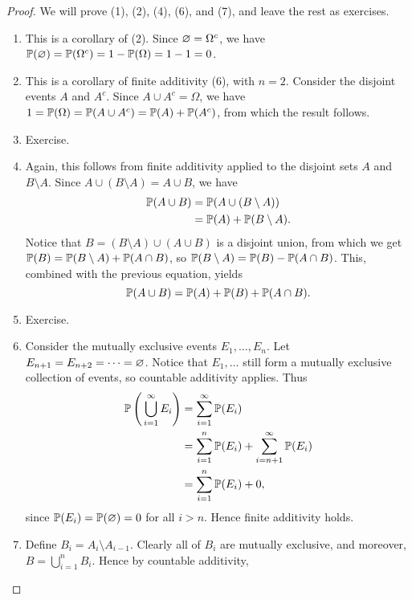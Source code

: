 \begin{proof}
  We will prove (1), (2), (4), (6), and (7), and leave the rest as exercises.
  \begin{enumerate}
    \item This is a corollary of (2). Since $\varnothing = \Omega^{c}$, we have $\operatorname{\mathbb{P}}(\varnothing) = \operatorname{\mathbb{P}}(\Omega^{c}) = 1 - \operatorname{\mathbb{P}}(\Omega) = 1 - 1 = 0$.
    \item This is a corollary of finite additivity (6), with $n = 2$. Consider the disjoint events $A$ and $A^{c}$. Since $A \cup A^{c} = \Omega$, we have $1 = \operatorname{\mathbb{P}}(\Omega) = \operatorname{\mathbb{P}}(A \cup A^{c}) = \operatorname{\mathbb{P}}(A) + \operatorname{\mathbb{P}}(A^{c})$, from which the result follows.
    \item Exercise.
    \item Again, this follows from finite additivity applied to the disjoint sets $A$ and $B \setminus A$. Since $A \cup (B \setminus A) = A \cup B$, we have 
      \begin{align*}
        \operatorname{\mathbb{P}}(A \cup B) &= \operatorname{\mathbb{P}}(A \cup (B \setminus A)) \\
                        &= \operatorname{\mathbb{P}}(A) + \operatorname{\mathbb{P}}(B \setminus A).
      \end{align*}
      Notice that $B = (B \setminus A) \cup (A \cup B)$ is a disjoint union, from which we get $\operatorname{\mathbb{P}}(B) = \operatorname{\mathbb{P}}(B \setminus A) + \operatorname{\mathbb{P}}(A \cap B)$, so $\operatorname{\mathbb{P}}(B \setminus A) = \operatorname{\mathbb{P}}(B) - \operatorname{\mathbb{P}}(A \cap B)$. This, combined with the previous equation, yields \[
        \operatorname{\mathbb{P}}(A \cup B) = \operatorname{\mathbb{P}}(A) + \operatorname{\mathbb{P}}(B) + \operatorname{\mathbb{P}}(A \cap B).
      \] 
    \item Exercise.
    \item Consider the mutually exclusive events $E_1, \dots, E_n$. Let $E_{n+1} = E_{n+2} = \dots = \varnothing$. Notice that $E_1, \dots$ still form a mutually exclusive collection of events, so countable additivity applies. Thus 
      \begin{align*}
        \operatorname{\mathbb{P}} \left( \, \bigcup_{i = 1}^{\infty} E_i \right) &= \sum_{i = 1}^{\infty} \operatorname{\mathbb{P}}(E_i) \\
                                                             &= \sum_{i = 1}^{n} \operatorname{\mathbb{P}}(E_i) + \sum_{i = n+1}^{\infty} \operatorname{\mathbb{P}}(E_i) \\
                                                             &= \sum_{i = 1}^{n} \operatorname{\mathbb{P}}(E_i) + 0,
      \end{align*}
      since $\operatorname{\mathbb{P}}(E_i) = \operatorname{\mathbb{P}}(\varnothing) = 0$ for all $i > n$. Hence finite additivity holds.
    \item Define $B_i = A_i \setminus A_{i - 1}$. Clearly all of $B_i$ are mutually exclusive, and moreover, $B = \bigcup_{i = 1}^{n} B_i$. Hence by countable additivity, 

\end{enumerate}
\end{proof}

